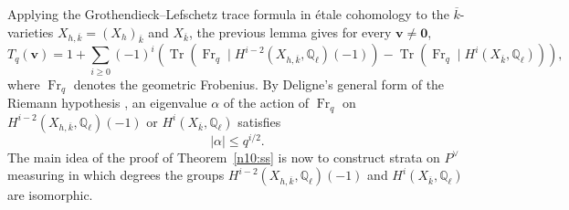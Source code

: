\documentclass[a4paper,11pt, twoside,reqno]{amsart}
\theoremstyle{plain}
\theoremstyle{definition}
\theoremstyle{remark}
\newcommand{\bfv}{\bm{v}}
\newcommand{\QQ}{\mathbb{Q}}
\DeclareMathOperator{\Fr}{Fr}
\DeclareMathOperator{\Tr}{Tr}
\renewcommand{\bar}{\overline}
\renewcommand{\leq}{\leqslant}
\renewcommand{\geq}{\geqslant}
\numberwithin{equation}{section}
\begin{document}
Applying the Grothendieck--Lefschetz trace formula in \'etale cohomology
to the $\bar k$-varieties $X_{h,\bar k} = (X_h)_{\bar k}$ and $X_{\bar k}$,
the previous lemma gives for every $\bfv\neq\bm0$,
\begin{equation}\label{app:ss:eq:trace}
 T_q(\bfv)=1+\sum_{i\geq0}(-1)^i\left(
 \Tr(\Fr_q\mid H^{i-2}(X_{h,\bar k},\QQ_\ell)(-1))
 -\Tr(\Fr_q\mid H^i(X_{\bar k},\QQ_\ell))\right),
\end{equation}
where $\Fr_q$ denotes the geometric Frobenius.
By Deligne's general form of the Riemann hypothesis \cite{Del},
an eigenvalue $\alpha$ of the action of $\Fr_q$
on $H^{i-2}(X_{h,\bar k},\QQ_\ell)(-1)$ or $H^i(X_{\bar k}, \QQ_\ell)$
satisfies $$|\alpha|\leq q^{i/2}.$$
The main idea of the proof of Theorem~\ref{n10:ss} is now
to construct strata on $P^\vee$ measuring in which degrees
the groups $H^{i-2}(X_{h,\bar k},\QQ_\ell)(-1)$ and $H^i(X_{\bar k}, \QQ_\ell)$ are isomorphic. 
\end{document}
